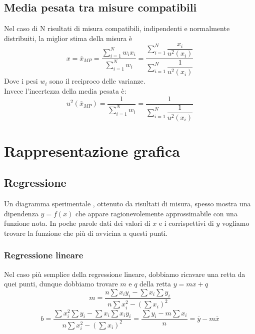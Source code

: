 \documentclass{article}
\begin{document}
	\subsection*{Media pesata tra misure compatibili}
	Nel caso di N risultati di misura compatibili, indipendenti e normalmente distribuiti, la miglior stima della misura è
	\begin{equation}
		x = \overline{x}_{MP} = \dfrac{\sum\limits_{i=1}^{N} w_i x_i}
									{\sum\limits_{i=1}^{N} w_i} 
			= 
			\dfrac{\sum\limits_{i=1}^{N} \dfrac{x_i}{u^2(x_i)}}{\sum\limits_{i=1}^{N} \dfrac{1}{u^2(x_i)}}
	\end{equation}
	Dove i pesi $w_i$ sono il reciproco delle varianze.\\
	Invece l'incertezza della media pesata è:
	\begin{equation}
		u^2(\overline{x}_{MP}) = \dfrac{1}{\sum\limits_{i=1}^{N} w_i} = \dfrac{1}{\sum\limits_{i=1}^{N} \dfrac{1}{u^2(x_i)}}
	\end{equation}
	
	\newpage
	\section*{Rappresentazione grafica}
	\subsection*{Regressione}
	Un diagramma sperimentale , ottenuto da risultati di misura, spesso mostra una dipendenza $y = f(x)$ che appare ragionevolemente approssimabile con una funzione nota. In poche parole dati dei valori di $x$ e i corrispettivi di $y$ vogliamo trovare la funzione che più di avvicina a questi punti.
	\subsubsection*{Regressione lineare}
	Nel caso più semplice della regressione lineare, dobbiamo ricavare una retta da quei punti, dunque dobbiamo trovare $m$ e $q$ della retta $y = mx + q$
	\begin{equation}
		m = \frac{n\sum x_i y_i - \sum x_i \sum y_i}{n\sum x_i^2 - \left(\sum x_i\right)^2}
	\end{equation}
	\begin{equation}
		b = \frac{\sum x_i^2\sum y_i - \sum x_i \sum x_i y_i}{n\sum x_i^2 - \left(\sum x_i\right)^2} =
		\frac{\sum y_i - m\sum x_i}{n} = \overline{y} - m\overline{x}
	\end{equation}
	
\end{document}
